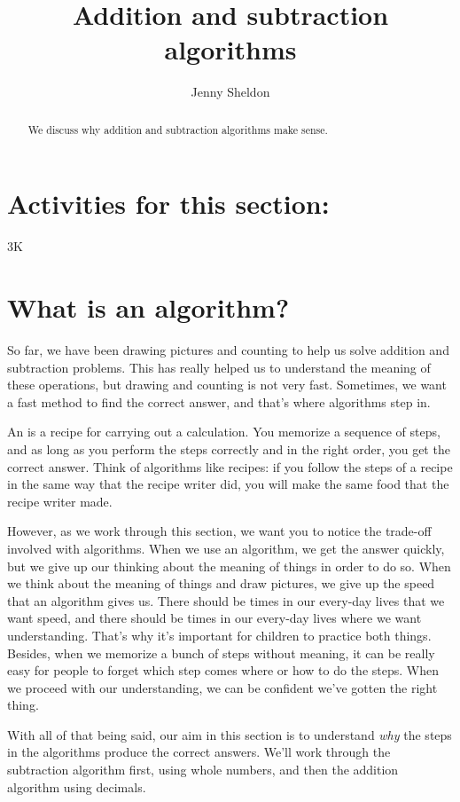 \documentclass{ximera}
\title{Addition and subtraction algorithms}
\author{Jenny Sheldon}
\begin{document}
\begin{abstract}
We discuss why addition and subtraction algorithms make sense.
\end{abstract}
\maketitle

\section{Activities for this section:} 3K

\section{What is an algorithm?}

So far, we have been drawing pictures and counting to help us solve addition and subtraction problems. This has really helped us to understand the meaning of these operations, but drawing and counting is not very fast. Sometimes, we want a fast method to find the correct answer, and that's where algorithms step in.

An  is a recipe for carrying out a calculation. You memorize a sequence of steps, and as long as you perform the steps correctly and in the right order, you get the correct answer. Think of algorithms like recipes: if you follow the steps of a recipe in the same way that the recipe writer did, you will make the same food that the recipe writer made.

However, as we work through this section, we want you to notice the trade-off involved with algorithms. When we use an algorithm, we get the answer quickly, but we give up our thinking about the meaning of things in order to do so. When we think about the meaning of things and draw pictures, we give up the speed that an algorithm gives us. There should be times in our every-day lives that we want speed, and there should be times in our every-day lives where we want understanding. That's why it's important for children to practice both things. Besides, when we memorize a bunch of steps without meaning, it can be really easy for people to forget which step comes where or how to do the steps. When we proceed with our understanding, we can be confident we've gotten the right thing.

With all of that being said, our aim in this section is to understand \emph{why} the steps in the algorithms produce the correct answers. We'll work through the subtraction algorithm first, using whole numbers, and then the addition algorithm using decimals.
\end{document}
